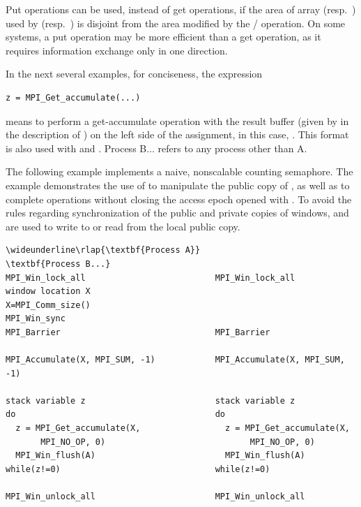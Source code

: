 \begin{example}
Put operations can be used, instead of get operations, if the area of array
 (resp.\ ) used by 
(resp.\ ) is disjoint from the area
modified by the \RMA/ operation.  On some systems, a put operation may be
more efficient than a get operation, as it requires information exchange
only in one direction.

\end{example}

In the next several examples, for conciseness, the expression
\begin{Verbatim}
z = MPI_Get_accumulate(...)
\end{Verbatim}
\lstset{fancyvrb=false}
means to perform a get-accumulate operation with the result
buffer (given by  in the description of
) on the left side of the
assignment, in 
this case, .  This format is also used with
 and .
Process B$\ldots$ refers to any process other than A.

\begin{example}
%
The following example implements a naive, nonscalable counting
semaphore.  The example demonstrates the use of
 to manipulate the public copy of , as well
as  to complete operations without closing the
access epoch opened with .  To avoid the
rules regarding synchronization of the public and private copies of
windows,  and 
are used to write to or read from the local public copy.
\begin{Verbatim}[commandchars=\\\{\}]
\wideunderline\rlap{\textbf{Process A}}                                          \textbf{Process B...}
MPI_Win_lock_all                          MPI_Win_lock_all
window location X
X=MPI_Comm_size()
MPI_Win_sync
MPI_Barrier                               MPI_Barrier

MPI_Accumulate(X, MPI_SUM, -1)            MPI_Accumulate(X, MPI_SUM, -1)

stack variable z                          stack variable z
do                                        do
  z = MPI_Get_accumulate(X,                 z = MPI_Get_accumulate(X,
       MPI_NO_OP, 0)                             MPI_NO_OP, 0)
  MPI_Win_flush(A)                          MPI_Win_flush(A)
while(z!=0)                               while(z!=0)

MPI_Win_unlock_all                        MPI_Win_unlock_all
\end{Verbatim}
\lstset{fancyvrb=false}
\end{example}

